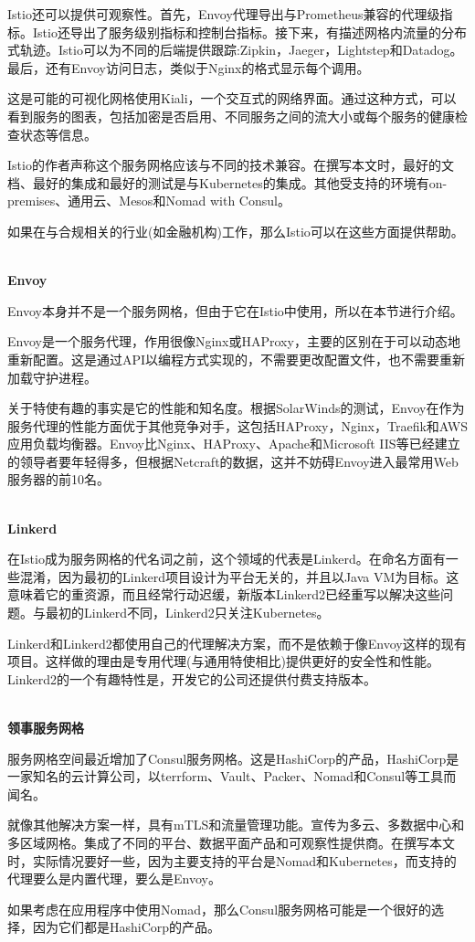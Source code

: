 Istio还可以提供可观察性。首先，Envoy代理导出与Prometheus兼容的代理级指标。Istio还导出了服务级别指标和控制台指标。接下来，有描述网格内流量的分布式轨迹。Istio可以为不同的后端提供跟踪:Zipkin，Jaeger，Lightstep和Datadog。最后，还有Envoy访问日志，类似于Nginx的格式显示每个调用。

这是可能的可视化网格使用Kiali，一个交互式的网络界面。通过这种方式，可以看到服务的图表，包括加密是否启用、不同服务之间的流大小或每个服务的健康检查状态等信息。

Istio的作者声称这个服务网格应该与不同的技术兼容。在撰写本文时，最好的文档、最好的集成和最好的测试是与Kubernetes的集成。其他受支持的环境有on-premises、通用云、Mesos和Nomad with Consul。

如果在与合规相关的行业(如金融机构)工作，那么Istio可以在这些方面提供帮助。

\hspace*{\fill} \\ %
\noindent
\textbf{Envoy}

Envoy本身并不是一个服务网格，但由于它在Istio中使用，所以在本节进行介绍。

Envoy是一个服务代理，作用很像Nginx或HAProxy，主要的区别在于可以动态地重新配置。这是通过API以编程方式实现的，不需要更改配置文件，也不需要重新加载守护进程。

关于特使有趣的事实是它的性能和知名度。根据SolarWinds的测试，Envoy在作为服务代理的性能方面优于其他竞争对手，这包括HAProxy，Nginx，Traefik和AWS应用负载均衡器。Envoy比Nginx、HAProxy、Apache和Microsoft IIS等已经建立的领导者要年轻得多，但根据Netcraft的数据，这并不妨碍Envoy进入最常用Web服务器的前10名。

\hspace*{\fill} \\ %
\noindent
\textbf{Linkerd}

在Istio成为服务网格的代名词之前，这个领域的代表是Linkerd。在命名方面有一些混淆，因为最初的Linkerd项目设计为平台无关的，并且以Java VM为目标。这意味着它的重资源，而且经常行动迟缓，新版本Linkerd2已经重写以解决这些问题。与最初的Linkerd不同，Linkerd2只关注Kubernetes。

Linkerd和Linkerd2都使用自己的代理解决方案，而不是依赖于像Envoy这样的现有项目。这样做的理由是专用代理(与通用特使相比)提供更好的安全性和性能。Linkerd2的一个有趣特性是，开发它的公司还提供付费支持版本。

\hspace*{\fill} \\ %
\noindent
\textbf{领事服务网格}

服务网格空间最近增加了Consul服务网格。这是HashiCorp的产品，HashiCorp是一家知名的云计算公司，以terrform、Vault、Packer、Nomad和Consul等工具而闻名。

就像其他解决方案一样，具有mTLS和流量管理功能。宣传为多云、多数据中心和多区域网格。集成了不同的平台、数据平面产品和可观察性提供商。在撰写本文时，实际情况要好一些，因为主要支持的平台是Nomad和Kubernetes，而支持的代理要么是内置代理，要么是Envoy。

如果考虑在应用程序中使用Nomad，那么Consul服务网格可能是一个很好的选择，因为它们都是HashiCorp的产品。






















